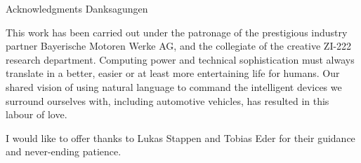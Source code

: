 \makeatletter
{}
{}
{}
\makeatother
\thispagestyle{empty}

\vspace*{20mm}

\begin{center}
\makeatletter
{}
{ Acknowledgments}
{ Danksagungen}
\makeatother
\end{center}

\vspace{10mm}

This work has been carried out under the patronage of the prestigious industry partner Bayerische Motoren Werke AG, and the collegiate of the creative ZI-222 research department. Computing power and technical sophistication must always translate in a better, easier or at least more entertaining life for humans. Our shared vision of using natural language to command the intelligent devices we surround ourselves with, including automotive vehicles, has resulted in this labour of love.

I would like to offer thanks to Lukas Stappen and Tobias Eder for their guidance and never-ending patience.

\cleardoublepage{}

